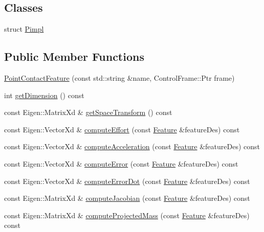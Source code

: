 \subsection*{Classes}
\begin{DoxyCompactItemize}
\item 
struct \hyperlink{structocra_1_1PointContactFeature_1_1Pimpl}{Pimpl}
\end{DoxyCompactItemize}
\subsection*{Public Member Functions}
\begin{DoxyCompactItemize}
\item 
\hyperlink{classocra_1_1PointContactFeature_aeaaae6acc15b47e89210b57dd34b3f73}{Point\+Contact\+Feature} (const std\+::string \&name, Control\+Frame\+::\+Ptr frame)
\item 
int \hyperlink{classocra_1_1PointContactFeature_a28144e416e1b93448b00ba3b78418953}{get\+Dimension} () const 
\item 
const Eigen\+::\+Matrix\+Xd \& \hyperlink{classocra_1_1PointContactFeature_a4c67d43379c63f3359f7fb9538f7f765}{get\+Space\+Transform} () const 
\item 
const Eigen\+::\+Vector\+Xd \& \hyperlink{classocra_1_1PointContactFeature_a06f149e18619a9577354485b070f0d76}{compute\+Effort} (const \hyperlink{classocra_1_1Feature}{Feature} \&feature\+Des) const 
\item 
const Eigen\+::\+Vector\+Xd \& \hyperlink{classocra_1_1PointContactFeature_af41c711785739f35af36df35cb605338}{compute\+Acceleration} (const \hyperlink{classocra_1_1Feature}{Feature} \&feature\+Des) const 
\item 
const Eigen\+::\+Vector\+Xd \& \hyperlink{classocra_1_1PointContactFeature_aab31bb79a7c0ddfbaa9062e0573af936}{compute\+Error} (const \hyperlink{classocra_1_1Feature}{Feature} \&feature\+Des) const 
\item 
const Eigen\+::\+Vector\+Xd \& \hyperlink{classocra_1_1PointContactFeature_ab4f9104a900a03f8f055693de63bd5d8}{compute\+Error\+Dot} (const \hyperlink{classocra_1_1Feature}{Feature} \&feature\+Des) const 
\item 
const Eigen\+::\+Matrix\+Xd \& \hyperlink{classocra_1_1PointContactFeature_a148cca0f023a0394331794f5f81a797d}{compute\+Jacobian} (const \hyperlink{classocra_1_1Feature}{Feature} \&feature\+Des) const 
\item 
const Eigen\+::\+Matrix\+Xd \& \hyperlink{classocra_1_1PointContactFeature_aeef52f94afec92719eaa7c777f6c9f58}{compute\+Projected\+Mass} (const \hyperlink{classocra_1_1Feature}{Feature} \&feature\+Des) const 

\end{DoxyCompactItemize}
